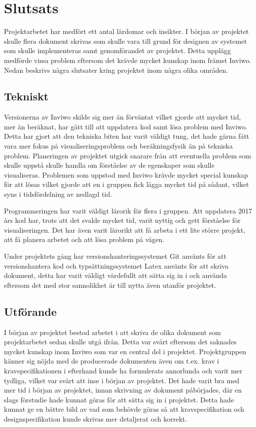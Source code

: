 \documentclass[a4paper,12pt]{article}
\begin{document}
\section{Slutsats}
\label{ch:slutsats} 
Projektarbetet har medfört ett antal lärdomar och insikter. I början av projektet skulle flera dokument skrivas som skulle vara till grund för designen av systemet som skulle implementeras samt genomförandet av projektet. Detta upplägg medförde vissa problem eftersom det krävde mycket kunskap inom främst Inviwo. Nedan beskrivs några slutsater kring projektet inom några olika områden.

\subsection{Tekniskt}
Versionerna av Inviwo skilde sig mer än förväntat vilket gjorde att mycket tid, mer än beräknat, har gått till att uppdatera kod samt lösa problem med Inviwo. Detta har gjort att den tekniska biten har varit väldigt tung, det hade gärna fått vara mer fokus på visualiseringsproblem och beräkningsfysik än på tekniska problem. Planeringen av projektet utgick snarare från att eventuella problem som skulle uppstå skulle handla om förståelse av de egenskaper som skulle visualiseras. Problemen som uppstod med Inviwo krävde mycket special kunskap för att lösas vilket gjorde att en i gruppen fick lägga mycket tid på sådant, vilket syns i tidsfördelning av nedlagd tid. 

Programmeringen har varit väldigt lärorik för flera i gruppen. Att uppdatera 2017 års kod har, trots att det svalde mycket tid, varit nyttig och gett förståelse för visualiseringen. Det har även varit lärorikt att få arbeta i ett lite större projekt, att få planera arbetet och att lösa problem på vägen. 

Under projektets gång har versionshanteringssystemet Git använts för att versionshantera kod och typsättningssystemet Latex använts för att skriva dokument, detta har varit väldigt värdefullt att sätta sig in i och använda eftersom det med stor sannolikhet är till nytta även utanför projektet. 
\subsection{Utförande}
I början av projektet bestod arbetet i att skriva de olika dokument som projektarbetet sedan skulle utgå ifrån. Detta var svårt eftersom det saknades mycket kunskap inom Inviwo som  var en central del i projektet. Projektgruppen känner sig nöjda med de producerade dokumenten även om t.ex. krav i kravspecifikationen i efterhand kunde ha formulerats annorlunda och varit mer tydliga, vilket var svårt att inse i början av projektet. Det hade varit bra med mer tid i början av projektet, innan skrivning av dokument påbörjades, där en slags förstudie hade kunnat göras för att sätta sig in i projektet. Detta hade kunnat ge en bättre bild av vad som behövde göras så att kravspecifikation och designspecifikation kunde skrivas mer detaljerat och korrekt. 
\end{document}

